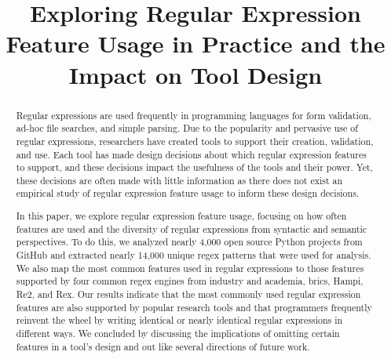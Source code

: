 \documentclass[conference]{IEEEtran}
\begin{document}
%
\title{Exploring Regular Expression Feature Usage in Practice and the Impact on Tool Design}

\author{
}

\maketitle


\begin{abstract}
Regular expressions are used frequently in programming languages for form validation, ad-hoc file searches, and simple parsing. Due to the popularity and pervasive use of regular expressions, researchers have created tools to support their creation, validation, and use. Each tool has made design decisions about which regular expression features to support, and these decisions impact the usefulness of the tools and their power. Yet, these decisions are often made with little information as there does not exist an empirical study of regular expression feature usage to inform these design decisions.

In this paper, we explore regular expression feature usage, focusing on how often features are used and the diversity of regular expressions from syntactic and semantic perspectives. To do this, we analyzed nearly 4,000 open source Python projects from GitHub and extracted nearly 14,000 unique regex patterns that were used for analysis.
We also map the most common features used in regular expressions to those features supported by four common regex engines from industry and academia, brics, Hampi, Re2, and Rex.
Our results indicate that the most commonly used regular expression features are also supported by popular research tools and that programmers frequently reinvent the wheel by writing identical or nearly identical regular expressions in different ways.
We concluded by discussing the implications of omitting certain features in a tool's design and out like several directions of future work.
\end{abstract}
\end{document}
